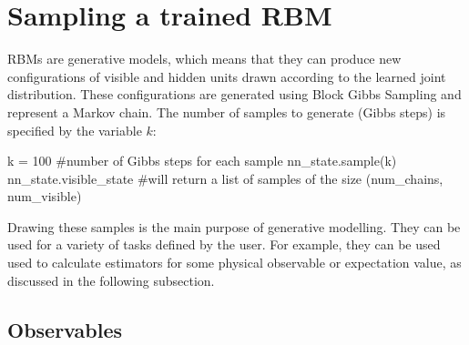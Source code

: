 \documentclass[submission, Phys]{SciPost}
\begin{document}

\section{Sampling a trained RBM}
\label{Sec:Sampling_a-Trained_RBM}

RBMs are generative models, which means that they can produce new configurations of visible and hidden units 
drawn according to the learned joint distribution. 
These configurations are generated using Block Gibbs Sampling and represent a Markov chain. 
The number of samples to generate (Gibbs steps) is specified by the variable $k$:
\begin{python}
k = 100 #number of Gibbs steps for each sample
nn_state.sample(k)
nn_state.visible_state #will return a list of samples of the size (num_chains, num_visible)
\end{python}
Drawing these samples is the main purpose of generative modelling. They can be used for a variety of tasks defined by the user. 
For example, they can be used used to calculate estimators for some physical observable or expectation value, as discussed in the following subsection.

\subsection{Observables}
\label{Sec:Observables}
\end{document}
